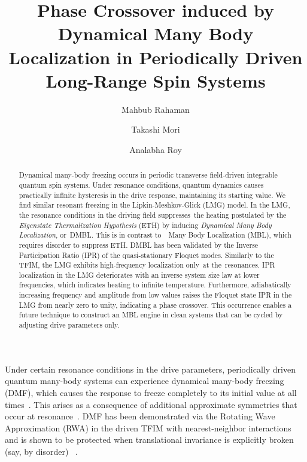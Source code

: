 \documentclass[%
reprint,
superscriptaddress,
amsmath,amssymb,
aps,
prb,
showkeys,
]{revtex4-2}
\begin{document}

\title{Phase Crossover induced by Dynamical Many Body Localization in Periodically Driven Long-Range Spin Systems}

\author{Mahbub Rahaman}
\author{Takashi Mori}
\author{Analabha Roy}


\begin{abstract}
	Dynamical many-body freezing occurs in periodic transverse field-driven integrable quantum spin systems. Under resonance conditions, quantum dynamics causes practically infinite hysteresis in the drive response, maintaining its starting value. We find similar resonant freezing in the Lipkin-Meshkov-Glick (LMG) model. In the LMG, the resonance conditions in the driving field suppresses the heating postulated by the \textit{Eigenstate Thermalization Hypothesis} (ETH)		
	by inducing \textit{Dynamical Many Body Localization}, or DMBL. This is in contrast to  Many Body Localization (MBL), which requires disorder to suppress ETH. DMBL has been validated by the Inverse Participation Ratio (IPR) of the quasi-stationary Floquet modes. Similarly to the TFIM, the LMG exhibits high-frequency localization only at the resonances. IPR localization in the LMG deteriorates with an inverse system size law at lower frequencies, which indicates heating to infinite temperature. Furthermore, adiabatically increasing frequency and amplitude from low values raises the Floquet state IPR in the LMG from nearly zero to unity, indicating a phase crossover. This occurrence enables a future technique to construct an MBL engine in clean systems that can be cycled by adjusting drive parameters only.
\end{abstract}

\maketitle

Under certain resonance conditions in the drive parameters, periodically driven quantum many-body systems can experience dynamical many-body freezing (DMF), which causes the response to freeze completely to its initial value at all times~\cite{bordia_periodically_2017, sahoo_periodically_2019, das_exotic_2010}. This arises as a consequence of additional approximate symmetries that occur at resonance~\cite{asmi:scars}. DMF has been demonstrated via the Rotating Wave Approximation (RWA) in the driven TFIM with nearest-neighbor interactions ~\cite{mbeng_quantum_2020} and is shown to be protected when translational invariance is explicitly broken (say, by disorder) ~\cite{yamada_localization_2022, roy_fate_2015}. 
\end{document}
